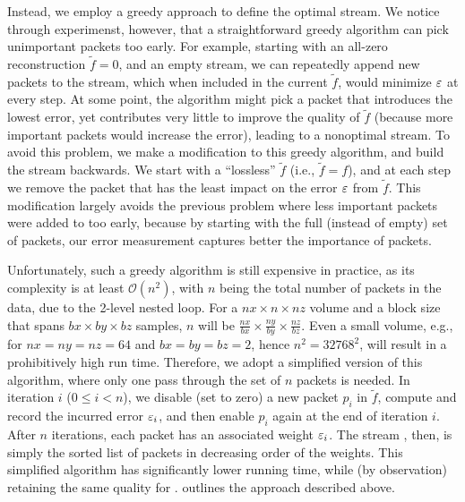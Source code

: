 Instead, we employ a greedy approach to define the optimal stream. We notice through experimenst,
however, that a straightforward greedy algorithm can pick unimportant packets too early. For
example, starting with an all-zero reconstruction $\tilde{f}=0$, and an empty stream, we can
repeatedly append new packets to the stream, which when included in the current $\tilde{f}$, would
minimize $\err$ at every step. At some point, the algorithm might pick a packet that introduces the
lowest error, yet contributes very little to improve the quality of $\tilde{f}$ (because more
important packets would increase the error), leading to a nonoptimal stream. To avoid this problem,
we make a modification to this greedy algorithm, and build the stream backwards. We start with a
``lossless'' $\tilde{f}$ (i.e., $\tilde{f}=f$), and at each step we remove the packet that has the
least impact on the error $\err$ from $\tilde{f}$. This modification largely avoids the previous
problem where less important packets were added to \sopt too early, because by starting with the
full (instead of empty) set of packets, our error measurement captures better the importance of
packets.

Unfortunately, such a greedy algorithm is still expensive in practice, as its complexity is at least
$\mathcal{O}(n^2)$, with $n$ being the total number of packets in the data, due to the 2-level
nested loop. For a $nx\times n\times nz$ volume and a block size that spans $bx\times by\times bz$
samples, $n$ will be $\frac{nx}{bx}\times \frac{ny}{by}\times \frac{nz}{bz}$. Even a small volume,
e.g., for $nx=ny=nz=64$ and $bx=by=bz=2$, hence $n^2=32768^2$, will result in a prohibitively high
run time. Therefore, we adopt a simplified version of this algorithm, where only one pass through
the set of $n$ packets is needed. In iteration $i$ ($0\leq i < n$), we disable (set to zero) a new
packet $p_i$ in $\tilde{f}$, compute and record the incurred error $\err_i$, and then enable $p_i$
again at the end of iteration $i$. After $n$ iterations, each packet has an associated weight
$\err_i$. The stream \sopt, then, is simply the sorted list of packets in decreasing order of the
weights. This simplified algorithm has significantly lower running time, while (by observation)
retaining the same quality for \sopt.  outlines the approach described above.

